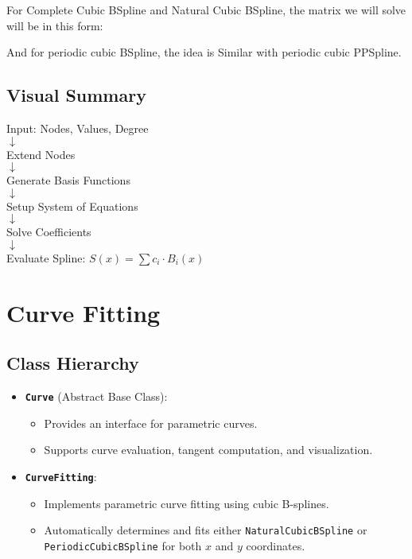 \documentclass[a4paper]{article}
\begin{document}
For Complete Cubic BSpline and Natural Cubic BSpline, the matrix we will solve will be in this form:

And for periodic cubic BSpline, the idea is Similar with periodic cubic PPSpline.

\subsection{Visual Summary}

\begin{tcolorbox}[colback=white!95!blue,colframe=blue!40!black,title=Algorithm Overview]
Input: Nodes, Values, Degree \\
$\downarrow$ \\
Extend Nodes \\
$\downarrow$ \\
Generate Basis Functions \\
$\downarrow$ \\
Setup System of Equations \\
$\downarrow$ \\
Solve Coefficients\\
$\downarrow$ \\
Evaluate Spline: $S(x) = \sum c_i \cdot B_i(x)$
\end{tcolorbox}

\section{Curve Fitting}

\subsection{Class Hierarchy}

\begin{itemize}
    \item \textbf{\texttt{Curve}} (Abstract Base Class):
    \begin{itemize}
        \item Provides an interface for parametric curves.
        \item Supports curve evaluation, tangent computation, and visualization.
    \end{itemize}
    \item \textbf{\texttt{CurveFitting}}:
    \begin{itemize}
        \item Implements parametric curve fitting using cubic B-splines.
        \item Automatically determines and fits either \texttt{NaturalCubicBSpline} or \texttt{PeriodicCubicBSpline} for both $x$ and $y$ coordinates.
    \end{itemize}
\end{itemize}
\end{document}
